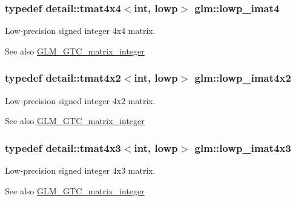 \subsubsection[{\texorpdfstring{lowp\+\_\+imat4}{lowp_imat4}}]{\setlength{\rightskip}{0pt plus 5cm}typedef detail\+::tmat4x4$<$int, lowp$>$ {\bf glm\+::lowp\+\_\+imat4}}\hypertarget{group__gtc__matrix__integer_ga7c687f14d923e05d5cf14aac41d10993}{}\label{group__gtc__matrix__integer_ga7c687f14d923e05d5cf14aac41d10993}
Low-\/precision signed integer 4x4 matrix. \begin{DoxySeeAlso}{See also}
\hyperlink{group__gtc__matrix__integer}{G\+L\+M\+\_\+\+G\+T\+C\+\_\+matrix\+\_\+integer} 
\end{DoxySeeAlso}
\subsubsection[{\texorpdfstring{lowp\+\_\+imat4x2}{lowp_imat4x2}}]{\setlength{\rightskip}{0pt plus 5cm}typedef detail\+::tmat4x2$<$int, lowp$>$ {\bf glm\+::lowp\+\_\+imat4x2}}\hypertarget{group__gtc__matrix__integer_ga0d7055814ab969df3b844ba9c52dbf61}{}\label{group__gtc__matrix__integer_ga0d7055814ab969df3b844ba9c52dbf61}
Low-\/precision signed integer 4x2 matrix. \begin{DoxySeeAlso}{See also}
\hyperlink{group__gtc__matrix__integer}{G\+L\+M\+\_\+\+G\+T\+C\+\_\+matrix\+\_\+integer} 
\end{DoxySeeAlso}
\subsubsection[{\texorpdfstring{lowp\+\_\+imat4x3}{lowp_imat4x3}}]{\setlength{\rightskip}{0pt plus 5cm}typedef detail\+::tmat4x3$<$int, lowp$>$ {\bf glm\+::lowp\+\_\+imat4x3}}\hypertarget{group__gtc__matrix__integer_ga73858cf965b0aa7e72908eb817c192d6}{}\label{group__gtc__matrix__integer_ga73858cf965b0aa7e72908eb817c192d6}
Low-\/precision signed integer 4x3 matrix. \begin{DoxySeeAlso}{See also}
\hyperlink{group__gtc__matrix__integer}{G\+L\+M\+\_\+\+G\+T\+C\+\_\+matrix\+\_\+integer} 
\end{DoxySeeAlso}
